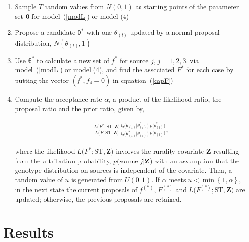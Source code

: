 \documentclass[times, doublespace]{simauth}%
\begin{document}
\begin{enumerate}

\item Sample $T$ random values from $N(0,1)$ as starting points of the parameter set $\boldsymbol{\theta}$ for model~(\ref{modL}) or model (4)
  
\item Propose a candidate $\boldsymbol{\theta}^*$ with one $\theta_{(t)}$ updated by a normal proposal distribution, $N(\theta_{(t)}, 1)$

\item Use $\boldsymbol{\theta}^*$ to calculate a new set of $f^*$ for source $j$, $j=1, 2, 3$, via model~(\ref{modL}) or model (4), and find the associated $F^*$ for each case by putting the vector $(f^*, f_4=0)$ in equation~(\ref{capF}) 
 
\item Compute the acceptance rate $\alpha$, a product of the likelihood ratio, the proposal ratio and the prior ratio, given by,
  
\begin{align*}
\frac{L\Big(F^*; \text{ST}, \boldsymbol{Z}\Big)}{L\Big(F; \text{ST}, \boldsymbol{Z}\Big)}\frac{Q\Big(\theta_{(t)} \vert \theta_{(t)}^*\Big)}{Q\Big(\theta_{(t)}^* \vert \theta_{(t)}\Big)}\frac{p\Big(\theta_{(t)}^*\Big)}{p\Big(\theta_{(t)}\Big)}, 
\end{align*}

where the likelihood $L\Big(F^*; \text{ST}, \boldsymbol{Z}\Big)$ involves the rurality covariate $\boldsymbol{Z}$ resulting from the attribution probability, $p(\text{source }j\vert \boldsymbol{Z}$) with an assumption that the genotype distribution on sources is independent of the covariate. Then, a random value of $u$ is generated from $U(0,1)$. If $\alpha$ meets $u < \min \left\{1, \alpha \right\}$, in the next state the current proposals of $f^{(*)}$, $F^{(*)}$ and $L\Big(F^{(*)}; \text{ST}, \boldsymbol{Z}\Big)$ are updated; otherwise, the previous proposals are retained. 
\end{enumerate}

\section{Results}
\end{document}
